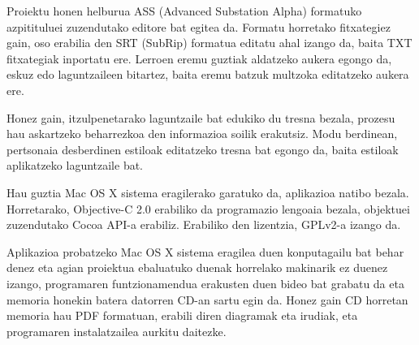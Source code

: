 
\thispagestyle{empty}
Proiektu honen helburua ASS (Advanced Substation Alpha) formatuko azpitituluei zuzendutako editore bat egitea da. Formatu horretako fitxategiez gain, oso erabilia den SRT (SubRip) formatua editatu ahal izango da, baita TXT fitxategiak inportatu ere. Lerroen eremu guztiak aldatzeko aukera egongo da, eskuz edo laguntzaileen bitartez, baita eremu batzuk multzoka editatzeko aukera ere.

Honez gain, itzulpenetarako laguntzaile bat edukiko du tresna bezala, prozesu hau askartzeko beharrezkoa den informazioa soilik erakutsiz. Modu berdinean, pertsonaia desberdinen estiloak editatzeko tresna bat egongo da, baita estiloak aplikatzeko laguntzaile bat.

Hau guztia Mac OS X sistema eragilerako garatuko da, aplikazioa natibo bezala. Horretarako, Objective-C 2.0 erabiliko da programazio lengoaia bezala, objektuei zuzendutako Cocoa API-a erabiliz. Erabiliko den lizentzia, GPLv2-a izango da.

Aplikazioa probatzeko Mac OS X sistema eragilea duen konputagailu bat behar denez eta agian proiektua ebaluatuko duenak horrelako makinarik ez duenez izango, programaren funtzionamendua erakusten duen bideo bat grabatu da eta memoria honekin batera datorren CD-an sartu egin da. Honez gain CD horretan memoria hau PDF formatuan, erabili diren diagramak eta irudiak, eta programaren instalatzailea aurkitu daitezke.
\clearpage                         %
\thispagestyle{empty} \ \clearpage %
